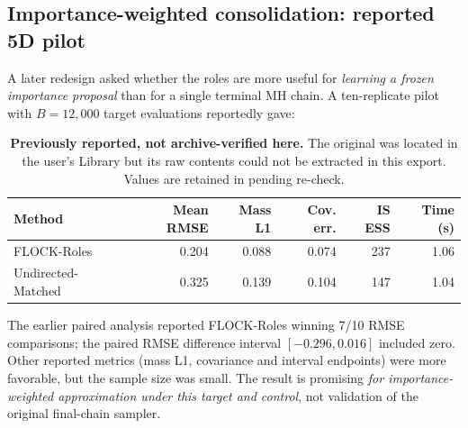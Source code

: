 \documentclass[11pt,letterpaper]{article}
\begin{document}
\subsection{Importance-weighted consolidation: reported 5D pilot}
A later redesign asked whether the roles are more useful for \emph{learning a frozen importance proposal} than for a single terminal MH chain. A ten-replicate pilot with \(B=12{,}000\) target evaluations reportedly gave:
\begin{table}[H]\centering\small
\begin{tabular}{lrrrrr}
\toprule
Method & Mean RMSE & Mass L1 & Cov. err. & IS ESS & Time (s)\\
\midrule
FLOCK-Roles & 0.204 & 0.088 & 0.074 & 237 & 1.06\\
Undirected-Matched & 0.325 & 0.139 & 0.104 & 147 & 1.04\\
\bottomrule
\end{tabular}
\caption{\textbf{Previously reported, not archive-verified here.} The original \protect{} was located in the user's Library but its raw contents could not be extracted in this export. Values are retained in \protect{} pending re-check.}
\end{table}
The earlier paired analysis reported FLOCK-Roles winning 7/10 RMSE comparisons; the paired RMSE difference interval \([-0.296,0.016]\) included zero. Other reported metrics (mass L1, covariance and interval endpoints) were more favorable, but the sample size was small. The result is promising \emph{for importance-weighted approximation under this target and control}, not validation of the original final-chain sampler.
\end{document}
